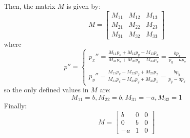 \documentclass{article}
\begin{document}
Then, the matrix $M$ is given by:
\[
    M =
    \begin{bmatrix}
        M_{11} & M_{12} & M_{13} \\
        M_{21} & M_{22} & M_{23} \\
        M_{31} & M_{32} & M_{33}
    \end{bmatrix}
\]
where
\begin{equation*}
    p'' =
    \begin{cases}
        p_x'' = \frac{M_{11}p_x + M_{12}p_y + M_{13}p_x}{M_{31}p_x + M_{32}p_y + M_{33}p_x} = \frac{bp_x}{p_y - ap_x} \\\\
        p_y'' = \frac{M_{21}p_x + M_{22}p_y + M_{23}p_x}{M_{31}p_x + M_{32}p_y + M_{33}p_x} = \frac{bp_y}{p_y - ap_x}
    \end{cases}
\end{equation*}
so the only defined values in $M$ are:
\[
    M_{11} = b, M_{22} = b, M_{31} = -a, M_{32} = 1
\]
Finally:
\[
    M =
    \begin{bmatrix}
        b  & 0 & 0 \\
        0  & b & 0 \\
        -a & 1 & 0
    \end{bmatrix}
\]
\end{document}
